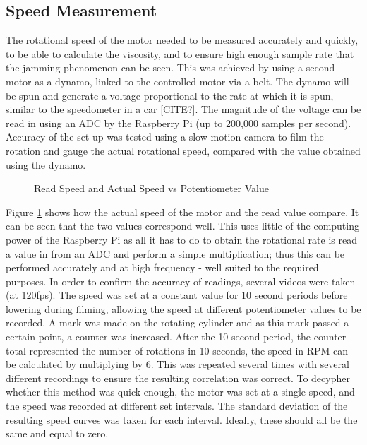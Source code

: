 \documentclass[twoside,a4]{report}
\def\br{\newline \newline \noindent}
\begin{document}
	\subsection{Speed Measurement}
	The rotational speed of the motor needed to be measured accurately and quickly, to be able to calculate the viscosity, and to ensure high enough sample rate that the jamming phenomenon can be seen. This was achieved by using a second motor as a dynamo, linked to the controlled motor via a belt. The dynamo will be spun and generate a voltage proportional to the rate at which it is spun, similar to the speedometer in a car [CITE?]. The magnitude of the voltage can be read in using an ADC by the Raspberry Pi (up to 200,000 samples per second). Accuracy of the set-up was tested using a slow-motion camera to film the rotation and gauge the actual rotational speed, compared with the value obtained using the dynamo.
	\begin{figure}[!htb]
		\centering
		\caption{Read Speed and Actual Speed vs Potentiometer Value}
		\label{figdynocheck}
	\end{figure} \newline  \noindent
	Figure \ref{figdynocheck} shows how the actual speed of the motor and the read value compare. It can be seen that the two values correspond well. This uses little of the computing power of the Raspberry Pi as all it has to do to obtain the rotational rate is read a value in from an ADC and perform a simple multiplication; thus this can be performed accurately and at high frequency - well suited to the required purposes.\br
	In order to confirm the accuracy of readings, several videos were taken (at 120fps). The speed was set at a constant value for 10 second periods before lowering during filming, allowing the speed at different potentiometer values to be recorded. A mark was made on the rotating cylinder and as this mark passed a certain point, a counter was increased. After the 10 second period, the counter total represented the number of rotations in 10 seconds, the speed in RPM can be calculated by multiplying by 6. This was repeated several times with several different recordings to ensure the resulting correlation was correct. \br
	To decypher whether this method was quick enough, the motor was set at a single speed, and the speed was recorded at different set intervals. The standard deviation of the resulting speed curves was taken for each interval. Ideally, these should all be the same and equal to zero. %
	
\end{document}
